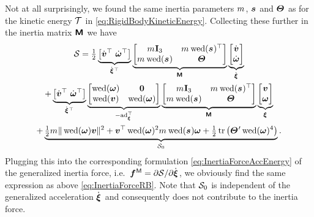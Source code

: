 Not at all surprisingly, we found the same inertia parameters $\bodyMass{}{}$, $\bodyCOM{}{}$ and $\bodyMOI{}{}$ as for the kinetic energy $\mathcal{T}$ in \eqref{eq:RigidBodyKineticEnergy}.
Collecting these further in the inertia matrix $\bodyInertiaMat{}{}$ we have
\begin{multline}\label{eq:RigidBodyAccEnergyMatrix}
 \accEnergy = \tfrac{1}{2} \underbrace{\big[ \vd^\top \ \wdot^\top \big]}_{\bodyVeld{}{}^\top}
 \underbrace{\begin{bmatrix} \bodyMass{}{}\idMat[3] & \bodyMass{}{} \wedOp(\bodyCOM{}{})^\top \\ \bodyMass{}{} \wedOp(\bodyCOM{}{}) & \bodyMOI{}{} \end{bmatrix}}_{\bodyInertiaMat{}{}}
 \underbrace{\begin{bmatrix} \vd \\ \wdot \end{bmatrix}}_{\bodyVeld{}{}}
\\
 + \underbrace{\big[ \vd^\top \ \wdot^\top \big]}_{\bodyVeld{}{}^\top} 
 \underbrace{\begin{bmatrix} \wedOp(\w) & \mat{0} \\ \wedOp(\v) & \wedOp(\w) \end{bmatrix}}_{-\ad{\bodyVel{}{}}^\top} 
 \underbrace{\begin{bmatrix} \bodyMass{}{}\idMat[3] & \bodyMass{}{} \wedOp(\bodyCOM{}{})^\top \\ \bodyMass{}{} \wedOp(\bodyCOM{}{}) & \bodyMOI{}{} \end{bmatrix}}_{\bodyInertiaMat{}{}} 
 \underbrace{\begin{bmatrix} \v \\ \w \end{bmatrix}}_{\bodyVel{}{}}
\\
 + \underbrace{\tfrac{1}{2} \bodyMass{}{} \norm{\wedOp(\w)\v}^2 + \v^\top \wedOp(\w)^2 \bodyMass{}{} \wedOp(\bodyCOM{}{}) \w + \tfrac{1}{2} \tr \big( \bodyMOIp{}{} \wedOp(\w)^4 \big)}_{\accEnergy_0}
 .
\end{multline}
Plugging this into the corresponding formulation \eqref{eq:InertiaForceAccEnergy} of the generalized inertia force, i.e.\ $\bodyGenForceInertia{}{} = \spdiff[\accEnergy]{\bodyVeld{}{}}$, we obviously find the same expression as above \eqref{eq:InertiaForceRB}.
Note that $\mathcal{S}_0$ is independent of the generalized acceleration $\bodyVeld{}{}$ and consequently does not contribute to the inertia force.


